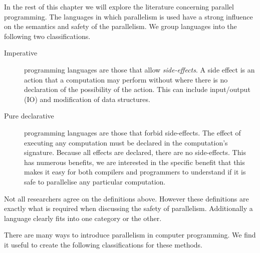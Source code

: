 
%


In the rest of this chapter we will explore the literature concerning
parallel programming.
The languages in which parallelism is used have a strong influence on the
semantics and safety of the parallelism.
We group languages into the following two classifications.

\begin{description}

    \item[Imperative] programming languages are those that allow
    \emph{side-effects}.
    A side effect is an action that a computation may perform without
    where there is no declaration of the possibility of the action.
    This can include input/output (IO) and modification of data structures.

    \item[Pure declarative] programming languages are those that forbid
    side-effects.
    The effect of executing any computation must be declared in the
    computation's signature.
    Because all effects are declared, there are no side-effects.
    This has numerous benefits, we are interested in the specific benefit
    that this makes it easy for both compilers and programmers to understand
    if it is safe to parallelise any particular computation.

\end{description}

\noindent
Not all researchers agree on the definitions above.
However these definitions are exactly what is required when discussing
the safety of parallelism.
Additionally a language clearly fits into one category or the other.

There are many ways to introduce parallelism in computer programming.
We find it useful to create the following classifications for these methods.

